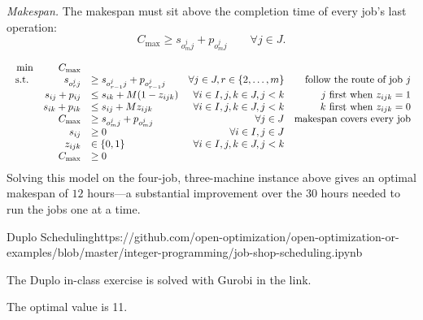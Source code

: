 \emph{Makespan.}
The makespan must sit above the completion time of every job's last operation:
$$
C_{\max} \geq s_{o^{j}_{m} j} + p_{o^{j}_{m} j} \qquad \forall j \in J.
$$

\begin{subequations}
\begin{equation}
\begin{array}{rrlrr}
\min
               & C_{\max} \\
\text{ s.t. }
&            s_{o^{j}_{r}j} &  \geq s_{o^{j}_{r-1}j} +p_{o^{j}_{r-1}j} & \forall j \in {J}, r \in \{2,\dots,m\} & \text{follow the route of job $j$} \\
             &      s_{ij} + p_{ij}     & \leq s_{ik} + M (1-z_{ijk}) & \forall i \in {I}, j,k \in {J}, j < k & \text{$j$ first when $z_{ijk} = 1$} \\
              &     s_{ik} + p_{ik}     & \leq s_{ij} + M z_{ijk} & \forall i \in {I}, j,k \in {J}, j < k & \text{$k$ first when $z_{ijk} = 0$}\\
            &       C_{\max}          & \geq s_{o^{j}_{m}j} + p_{o^{j}_{m}j} & \forall j \in {J} & \text{makespan covers every job}\\
            &      s_{ij}      & \geq 0 & \forall i \in {I}, j \in {J} \\
           &       z_{ijk}     & \in \{0,1\} & \forall i \in {I}, j,k \in {J}, j < k \\
          &        C_{\max} & \geq 0
              \end{array}
              \end{equation}
\end{subequations}
Solving this model on the four-job, three-machine instance above gives an optimal makespan of $12$ hours---a substantial improvement over the $30$ hours needed to run the jobs one at a time.
\begin{examplewithallcode}{Duplo Scheduling}{}{}{https://github.com/open-optimization/open-optimization-or-examples/blob/master/integer-programming/job-shop-scheduling.ipynb}

The Duplo in-class exercise is solved with Gurobi in the link.

The optimal value is 11.

\begin{center}
\par{}\label{fig:jssp-duplo}%


\par{}\label{fig:jssp-duplo-actual}%

\end{center}
\end{examplewithallcode}

